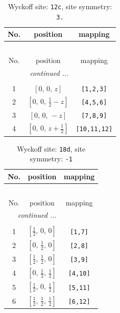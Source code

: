 \documentclass[fleqn,8pt]{jsarticle}
\begin{document}
\renewcommand{\arraystretch}{1.2}
\begin{longtable}{ccc}
\caption{Wyckoff site: {\tt 12c}, site symmetry: {\tt 3.}}
 \\
 \hline \hline
No. & position & mapping \\ \hline \endfirsthead

\multicolumn{2}{l}{\tablename\ \thetable{}} \\
 \hline \hline
No. & position & mapping \\ \hline \endhead

 \hline \hline
\multicolumn{2}{r}{\footnotesize\it continued ...} \\ \endfoot

 \hline \hline
\multicolumn{2}{r}{} \\ \endlastfoot

1 & $\left[ 0,\, 0,\, z \right]$ & {\tt [1,2,3]} \\ \hline
2 & $\left[ 0,\, 0,\, \frac{1}{2} - z \right]$ & {\tt [4,5,6]} \\ \hline
3 & $\left[ 0,\, 0,\, - z \right]$ & {\tt [7,8,9]} \\ \hline
4 & $\left[ 0,\, 0,\, z + \frac{1}{2} \right]$ & {\tt [10,11,12]} \\
\end{longtable}
\renewcommand{\arraystretch}{1.2}
\begin{longtable}{ccc}
\caption{Wyckoff site: {\tt 18d}, site symmetry: {\tt -1}}
 \\
 \hline \hline
No. & position & mapping \\ \hline \endfirsthead

\multicolumn{2}{l}{\tablename\ \thetable{}} \\
 \hline \hline
No. & position & mapping \\ \hline \endhead

 \hline \hline
\multicolumn{2}{r}{\footnotesize\it continued ...} \\ \endfoot

 \hline \hline
\multicolumn{2}{r}{} \\ \endlastfoot

1 & $\left[ \frac{1}{2},\, 0,\, 0 \right]$ & {\tt [1,7]} \\ \hline
2 & $\left[ 0,\, \frac{1}{2},\, 0 \right]$ & {\tt [2,8]} \\ \hline
3 & $\left[ \frac{1}{2},\, \frac{1}{2},\, 0 \right]$ & {\tt [3,9]} \\ \hline
4 & $\left[ 0,\, \frac{1}{2},\, \frac{1}{2} \right]$ & {\tt [4,10]} \\ \hline
5 & $\left[ \frac{1}{2},\, 0,\, \frac{1}{2} \right]$ & {\tt [5,11]} \\ \hline
6 & $\left[ \frac{1}{2},\, \frac{1}{2},\, \frac{1}{2} \right]$ & {\tt [6,12]} \\
\end{longtable}
\end{document}
